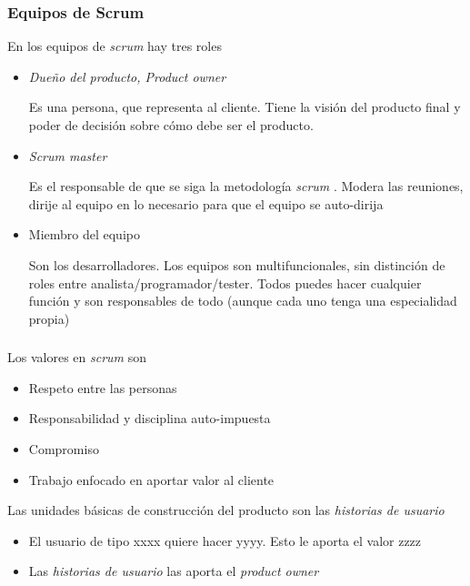 \documentclass[ucs]{beamer}
\begin{document}
\begin{frame}[fragile]
\frametitle{Equipos de Scrum}
En los equipos de
\emph{scrum}
hay tres roles


\begin{itemize}
\item
\emph{Dueño del producto, Product owner}

Es una persona, que representa al cliente. Tiene la visión del producto
final y poder de decisión sobre cómo debe ser el producto.

\item
\emph{Scrum master}


Es el responsable de que se siga la metodología 
\emph{scrum}
. Modera las reuniones,
dirije al equipo en lo necesario para que el equipo se auto-dirija

\item
Miembro del equipo

Son los desarrolladores. 
Los equipos son multifuncionales, sin distinción de roles entre analista/programador/tester.
Todos puedes hacer cualquier función y son responsables de todo (aunque cada uno tenga una
especialidad propia)
\end{itemize}
\end{frame}


\begin{frame}[fragile]
\frametitle{}
Los valores en 
\emph{scrum} 
son
\begin{itemize}
\item
Respeto entre las personas
\item
Responsabilidad y disciplina auto-impuesta
\item
Compromiso
\item
Trabajo enfocado en aportar valor al cliente
\end{itemize}


Las unidades básicas de construcción del producto son
las \emph{historias de usuario}

\begin{itemize}
\item
El usuario de tipo xxxx quiere hacer yyyy. Esto le aporta el valor zzzz

\item
Las \emph{historias de usuario}
las aporta el 
\emph{product owner}
\end{itemize}

\end{frame}
\end{document}
